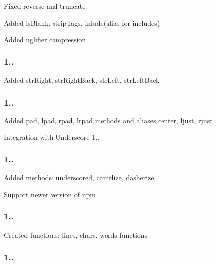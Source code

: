 \begin{DoxyItemize}
\item Fixed reverse and truncate
\item Added is\+Blank, strip\+Tags, inlude(alias for includes)
\item Added uglifier compression
\end{DoxyItemize}

\subsubsection*{1..}


\begin{DoxyItemize}
\item Added str\+Right, str\+Right\+Back, str\+Left, str\+Left\+Back
\end{DoxyItemize}

\subsubsection*{1..}


\begin{DoxyItemize}
\item Added pad, lpad, rpad, lrpad methods and aliases center, ljust, rjust
\item Integration with Underscore 1..
\end{DoxyItemize}

\subsubsection*{1..}


\begin{DoxyItemize}
\item Added methods\+: underscored, camelize, dasherize
\item Support newer version of npm
\end{DoxyItemize}

\subsubsection*{1..}


\begin{DoxyItemize}
\item Created functions\+: lines, chars, words functions
\end{DoxyItemize}

\subsubsection*{1..}


